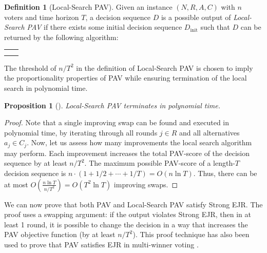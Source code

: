 \documentclass[10pt]{scrartcl}
\theoremstyle{plain}
\newtheorem{proposition}[theorem]{Proposition}
\theoremstyle{definition}
\newtheorem{definition}[theorem]{Definition}
\renewcommand*{\geq}{\geqslant}
\begin{document}
\begin{definition}[Local-Search PAV]
	Given an instance $(N, R, A, C)$ with $n$ voters and time horizon $T$, a decision sequence $D$ is a possible output of \emph{Local-Search PAV} if there exists some initial decision sequence $D_{\text{init}}$ such that $D$ can be returned by the following algorithm:
	
	\smallskip
	\begin{tabular}{l|l}
		&
	\hspace{-20pt}
	\begin{algorithm}[H]
		\vspace{-2pt}
		$D \gets D_{\text{init}}$\;
		\While{there is a round $j \in R$ and an alternative $a_j \in C_j$ such that $\operatorname{PAV-score}\left(D \setminus \{d_j\} \cup\left\{a_j\right\}\right) \geq \operatorname{PAV-score}(D) + \frac{n}{T^2}$   }
		{   
			$D \gets D \setminus \{d_j\} \cup\left\{a_j\right\} $\\
		}
		
		\Return $D$
	\end{algorithm}
\end{tabular}
\end{definition}

The threshold of $n/T^2$ in the definition of Local-Search PAV is chosen to imply the proportionality properties of PAV while ensuring termination of the local search in polynomial time.

\allowdisplaybreaks

\begin{proposition}[\citealp{aziz2018complexity}]
	\label{prop:LSPAVruntime}
	Local-Search PAV terminates in polynomial time.
\end{proposition}
\begin{proof}
	Note that a single improving swap can be found and executed in polynomial time, by iterating through all rounds $j \in R$ and all alternatives $a_j \in C_j$. Now, let us assess how many improvements the local search algorithm may perform. Each improvement increases the total PAV-score of the decision sequence by at least $n/T^2$. The maximum possible PAV-score of a length-$T$ decision sequence is $n \cdot(1+1 / 2+\cdots+1 / T)=O(n \ln T)$. Thus, there can be at most $O( \frac{n \ln T}{n/T^2}  ) = O(T^2 \ln T)$ improving swaps.
\end{proof}

We can now prove that both PAV and Local-Search PAV satisfy Strong EJR. The proof uses a swapping argument: if the output violates Strong EJR, then in at least 1 round, it is possible to change the decision in a way that increases the PAV objective function (by at least $n/T^2$). This proof technique has also been used to prove that PAV satisfies EJR in multi-winner voting \citep{ejr}.
\end{document}
